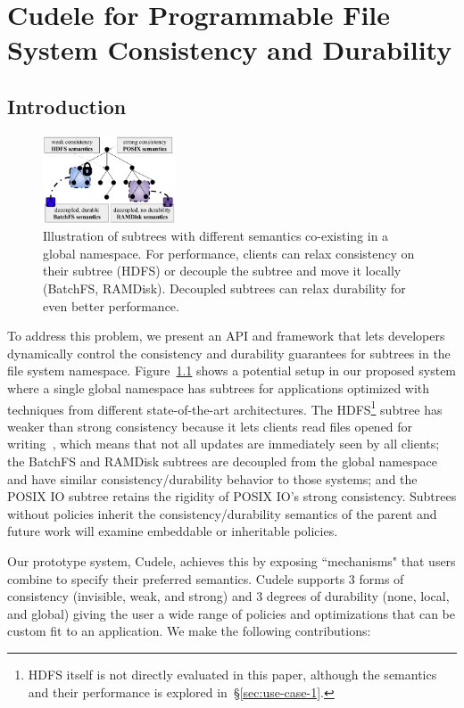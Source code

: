 \chapter{Cudele for Programmable File System Consistency and Durability}
\section{Introduction}

\begin{figure}[tb] \centering
\includegraphics[width=0.35\textwidth]{./chapters/cudele/figures/subtree-policies1.png}
\caption{Illustration of subtrees with different semantics co-existing in a
global namespace.  For performance, clients can relax consistency on their
subtree (HDFS) or decouple the subtree and move it locally (BatchFS, RAMDisk).
Decoupled subtrees can relax durability for even better performance.
}\label{fig:subtree-policies} \end{figure}

To address this problem, we present an API and framework that lets developers
dynamically control the consistency and durability guarantees for subtrees in
the file system namespace.  Figure~\ref{fig:subtree-policies} shows a potential
setup in our proposed system where a single global namespace has subtrees for
applications optimized with techniques from different state-of-the-art
architectures.  The HDFS\footnote{HDFS itself is not directly evaluated in this
paper, although the semantics and their performance is explored
in~\S\ref{sec:use-case-1}.} subtree has weaker than strong consistency because
it lets clients read files opened for
writing~\cite{hakimzadeh:dais14-hdfs-consistency}, which means that not all
updates are immediately seen by all clients; the BatchFS and RAMDisk subtrees
are decoupled from the global namespace and have similar consistency/durability
behavior to those systems; and the POSIX IO subtree retains the rigidity of
POSIX IO's strong consistency.  Subtrees without policies inherit the
consistency/durability semantics of the parent and future work will examine
embeddable or inheritable policies.

Our prototype system, Cudele, achieves this by exposing ``mechanisms" that
users combine to specify their preferred semantics.  Cudele supports 3 forms
of consistency (invisible, weak, and strong) and 3 degrees of durability (none,
local, and global) giving the user a wide range of policies and optimizations
that can be custom fit to an application. We make the following contributions:

